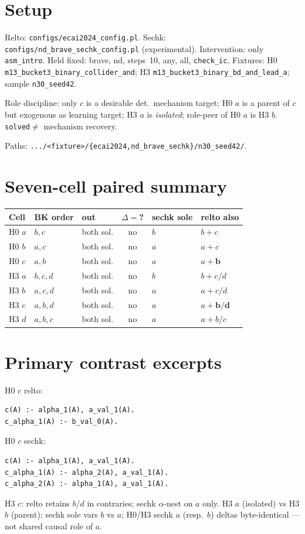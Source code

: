 \documentclass[11pt]{article}
\begin{document}
\section{Setup}

Relto: \texttt{configs/ecai2024\_config.pl}.
Sechk: \texttt{configs/nd\_brave\_sechk\_config.pl} (experimental).
Intervention: only \texttt{asm\_intro}.
Held fixed: brave, nd, steps~10, any, all, \texttt{check\_ic}.
Fixtures: H0 \texttt{m13\_bucket3\_binary\_collider\_and}; H3
\texttt{m13\_bucket3\_binary\_bd\_and\_lead\_a}; sample \texttt{n30\_seed42}.

Role discipline: only $c$ is a desirable det.\ mechanism target; H0 $a$ is a
parent of $c$ but exogenous as learning target; H3 $a$ is \emph{isolated};
role-peer of H0 $a$ is H3 $b$.
\texttt{solved}${}\neq{}$ mechanism recovery.

Paths:
\texttt{.../<fixture>/\{ecai2024,nd\_brave\_sechk\}/n30\_seed42/}.

\section{Seven-cell paired summary}

{\footnotesize
\begin{center}
\begin{tabular}{@{}lllcll@{}}
\toprule
Cell & BK order & out & $\Delta{=}$? & sechk sole & relto also \\
\midrule
H0 $a$ & $b,c$ & both sol. & no & $b$ & $b{+}c$ \\
H0 $b$ & $a,c$ & both sol. & no & $a$ & $a{+}c$ \\
H0 $c$ & $a,b$ & both sol. & no & $a$ & $a{+}\mathbf{b}$ \\
H3 $a$ & $b,c,d$ & both sol. & no & $b$ & $b{+}c/d$ \\
H3 $b$ & $a,c,d$ & both sol. & no & $a$ & $a{+}c/d$ \\
H3 $c$ & $a,b,d$ & both sol. & no & $a$ & $a{+}\mathbf{b/d}$ \\
H3 $d$ & $a,b,c$ & both sol. & no & $a$ & $a{+}b/c$ \\
\bottomrule
\end{tabular}
\end{center}
}

\section{Primary contrast excerpts}

H0 $c$ relto:
\begin{verbatim}
c(A) :- alpha_1(A), a_val_1(A).
c_alpha_1(A) :- b_val_0(A).
\end{verbatim}
H0 $c$ sechk:
\begin{verbatim}
c(A) :- alpha_1(A), a_val_1(A).
c_alpha_1(A) :- alpha_2(A), a_val_1(A).
c_alpha_2(A) :- alpha_1(A), a_val_1(A).
\end{verbatim}
H3 $c$: relto retains $b$/$d$ in contraries; sechk $\alpha$-nest on $a$ only.
H3 $a$ (isolated) vs H3 $b$ (parent): sechk sole vars $b$ vs $a$; H0/H3 sechk
$a$ (resp.\ $b$) deltas byte-identical --- not shared causal role of $a$.
\end{document}
